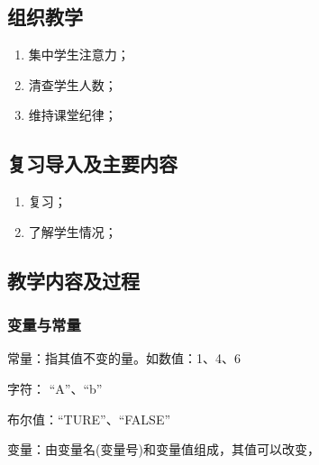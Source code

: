 \jxhj{%
	}
\skrq{%
	}

\makeshouye %

\subsection{组织教学}
\begin{enumerate}[\hspace{2em}1、]
	\item 集中学生注意力；
	\item 清查学生人数；
	\item 维持课堂纪律；
\end{enumerate}
\subsection{复习导入及主要内容}
\begin{enumerate}[\hspace{2em}1、]
\item 复习；
\item 了解学生情况；
\end{enumerate}
\subsection{教学内容及过程}
\subsubsection{变量与常量} 
常量：指其值不变的量。如数值：1、4、6
\par
字符： “A”、“b”
\par
布尔值：“TURE”、“FALSE”
\par
变量：由变量名(变量号)和变量值组成，其值可以改变，

